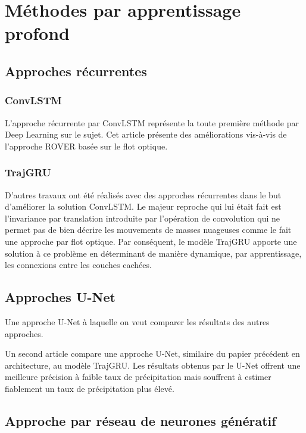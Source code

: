 \documentclass[11pt,a4paper,french]{article}
\begin{document}
\section{Méthodes par apprentissage profond}

\subsection{Approches récurrentes}

\subsubsection{ConvLSTM}

L'approche récurrente par ConvLSTM représente la toute première méthode par Deep Learning sur le sujet. Cet article présente des améliorations vis-à-vis de l'approche ROVER basée sur le flot optique. \cite{shi2015convolutional}

\subsubsection{TrajGRU}

D'autres travaux ont été réalisés avec des approches récurrentes dans le but d'améliorer la solution ConvLSTM. Le majeur reproche qui lui était fait est l'invariance par translation introduite par l'opération de convolution qui ne permet pas de bien décrire les mouvements de masses nuageuses comme le fait une approche par flot optique. Par conséquent, le modèle TrajGRU apporte une solution à ce problème en déterminant de manière dynamique, par apprentissage, les connexions entre les couches cachées. \cite{shi2017deep}

\subsection{Approches U-Net}

Une approche U-Net à laquelle on veut comparer les résultats des autres approches. \cite{bouget:hal-03112093} \newline

Un second article compare une approche U-Net, similaire du papier précédent en architecture, au modèle TrajGRU. Les résultats obtenus par le U-Net offrent une meilleure précision à faible taux de précipitation mais souffrent à estimer fiablement un taux de précipitation plus élevé.  \cite{9508500}

\subsection{Approche par réseau de neurones génératif}
\end{document}
